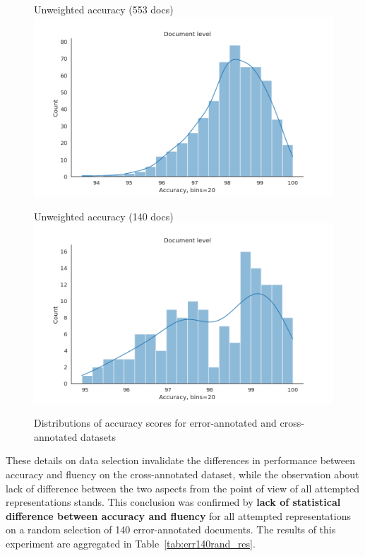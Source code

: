 \begin{figure}
	\begin{minipage}[c]{0.45\linewidth}
		\centering
		Unweighted accuracy (553 docs)
		\includegraphics[width=\linewidth]{figures/err/accuracy-distibution-noweights.png}
	\end{minipage}
	\begin{minipage}[c]{0.45\linewidth}
		\centering
		Unweighted accuracy (140 docs)
		\includegraphics[width=\linewidth]{figures/err/accuracy-distibution-140.png}
	\end{minipage}	
	\caption{\label{fig:acc140binomial}Distributions of accuracy scores for error-annotated and cross-annotated datasets}	
\end{figure}

These details on data selection invalidate the differences in performance between accuracy and fluency on the cross-annotated dataset, while the observation about lack of difference between the two aspects from the point of view of all attempted representations stands. 
This conclusion was confirmed by \textbf{lack of statistical difference between accuracy and fluency} for all attempted representations on a random selection of 140 error-annotated documents. 
The results of this experiment are aggregated in Table~\ref{tab:err140rand_res}.

